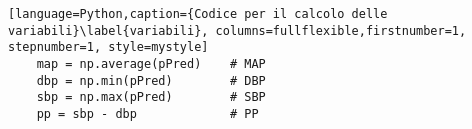 \begin{lstlisting}[language=Python,caption={Codice per il calcolo delle variabili}\label{variabili}, columns=fullflexible,firstnumber=1, stepnumber=1, style=mystyle]
    map = np.average(pPred)    # MAP
    dbp = np.min(pPred)        # DBP
    sbp = np.max(pPred)        # SBP 
    pp = sbp - dbp             # PP
\end{lstlisting}


